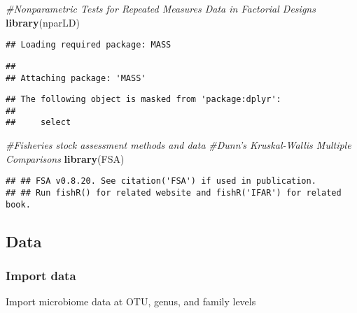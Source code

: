 \documentclass[]{article}
\newenvironment{Shaded}{\begin{snugshade}}{\end{snugshade}}
\newcommand{\KeywordTok}[1]{\textcolor[rgb]{0.13,0.29,0.53}{\textbf{#1}}}
\newcommand{\CommentTok}[1]{\textcolor[rgb]{0.56,0.35,0.01}{\textit{#1}}}
\newcommand{\NormalTok}[1]{#1}
\begin{document}
\begin{Shaded}
\begin{Highlighting}[]
\CommentTok{#Nonparametric Tests for Repeated Measures Data in Factorial Designs}
\KeywordTok{library}\NormalTok{(nparLD)}
\end{Highlighting}
\end{Shaded}

\begin{verbatim}
## Loading required package: MASS
\end{verbatim}

\begin{verbatim}
## 
## Attaching package: 'MASS'
\end{verbatim}

\begin{verbatim}
## The following object is masked from 'package:dplyr':
## 
##     select
\end{verbatim}

\begin{Shaded}
\begin{Highlighting}[]
\CommentTok{#Fisheries stock assessment methods and data}
\CommentTok{#Dunn's Kruskal-Wallis Multiple Comparisons}
\KeywordTok{library}\NormalTok{(FSA)}
\end{Highlighting}
\end{Shaded}

\begin{verbatim}
## ## FSA v0.8.20. See citation('FSA') if used in publication.
## ## Run fishR() for related website and fishR('IFAR') for related book.
\end{verbatim}

\subsection{Data}\label{data}

\subsubsection{Import data}\label{import-data}

Import microbiome data at OTU, genus, and family levels
\end{document}
